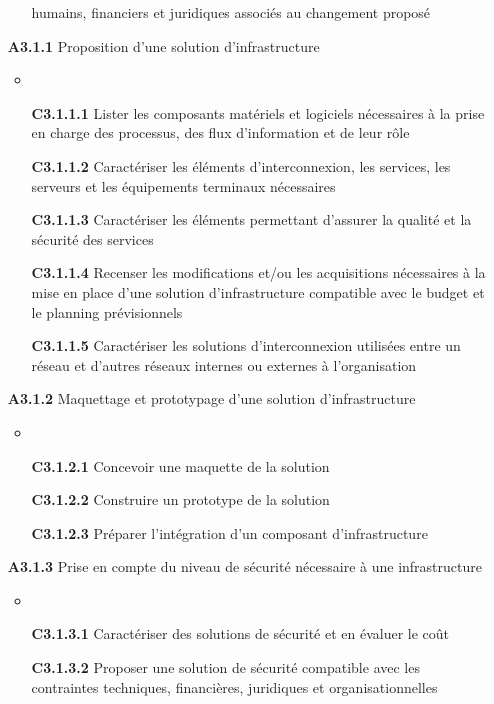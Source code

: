 \documentclass[12pt,a4paper,oneside,titlepage,final]{article}
\begin{document}
\begin{enumerate}
\begin{itemize}
    humains, financiers et juridiques associés au changement proposé
  \end{itemize}
  \item [\textbf{A3.1.1}] Proposition d'une solution d'infrastructure
  \begin{itemize}
    \item \item [\textbf{C3.1.1.1}] Lister les composants matériels et
    logiciels nécessaires à la prise en charge des processus, des flux
    d'information et de leur rôle
    \item [\textbf{C3.1.1.2}] Caractériser les éléments
    d'interconnexion, les services, les serveurs et les équipements
    terminaux nécessaires
    \item [\textbf{C3.1.1.3}] Caractériser les éléments permettant
    d'assurer la qualité et la sécurité des services
    \item [\textbf{C3.1.1.4}] Recenser les modifications et/ou les
    acquisitions nécessaires à la mise en place d'une solution
    d'infrastructure compatible avec le budget et le planning
    prévisionnels
    \item [\textbf{C3.1.1.5}] Caractériser les solutions
    d'interconnexion utilisées entre un réseau et d'autres réseaux
    internes ou externes à l'organisation
  \end{itemize}
  \item [\textbf{A3.1.2}] Maquettage et prototypage d'une solution
  d'infrastructure
  \begin{itemize}
    \item \item [\textbf{C3.1.2.1}] Concevoir une maquette de la
    solution
    \item [\textbf{C3.1.2.2}] Construire un prototype de la solution
    \item [\textbf{C3.1.2.3}] Préparer l'intégration d'un composant
    d'infrastructure
  \end{itemize}
  \item [\textbf{A3.1.3}] Prise en compte du niveau de sécurité
  nécessaire à une infrastructure
  \begin{itemize}
    \item \item [\textbf{C3.1.3.1}] Caractériser des solutions de
    sécurité et en évaluer le coût
    \item [\textbf{C3.1.3.2}] Proposer une solution de sécurité
    compatible avec les contraintes techniques, financières,
    juridiques et organisationnelles

\end{itemize}
\end{enumerate}
\end{document}
